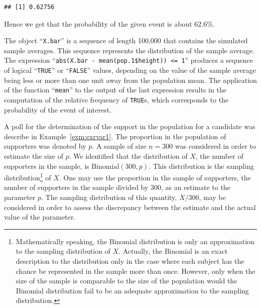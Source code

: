 \documentclass[]{krantz}
\makeatletter
\newenvironment{Shaded}{\begin{snugshade}}{\end{snugshade}}
\newcommand{\KeywordTok}[1]{\textcolor[rgb]{0.13,0.29,0.53}{\textbf{#1}}}
\newcommand{\DecValTok}[1]{\textcolor[rgb]{0.00,0.00,0.81}{#1}}
\newcommand{\StringTok}[1]{\textcolor[rgb]{0.31,0.60,0.02}{#1}}
\newcommand{\OperatorTok}[1]{\textcolor[rgb]{0.81,0.36,0.00}{\textbf{#1}}}
\newcommand{\NormalTok}[1]{#1}
\newenvironment{kframe}{%
\medskip{}
\setlength{\fboxsep}{.8em}
 \def\at@end@of@kframe{}%
 \ifinner\ifhmode%
  \def\at@end@of@kframe{\end{minipage}}%
  \begin{minipage}{\columnwidth}%
 \fi\fi%
 \def\FrameCommand##1{\hskip\@totalleftmargin \hskip-\fboxsep
 \colorbox{shadecolor}{##1}\hskip-\fboxsep
     \hskip-\linewidth \hskip-\@totalleftmargin \hskip\columnwidth}%
 \MakeFramed {\advance\hsize-\width
   \@totalleftmargin\z@ \linewidth\hsize
   \@setminipage}}%
 {\par\unskip\endMakeFramed%
 \at@end@of@kframe}
\renewenvironment{Shaded}{\begin{kframe}}{\end{kframe}}
\theoremstyle{definition}
\theoremstyle{definition}
\theoremstyle{definition}
\theoremstyle{remark}
\let\BeginKnitrBlock\begin \let\EndKnitrBlock\end
\makeatother
\begin{document}
\begin{Shaded}
\end{Shaded}

\begin{verbatim}
## [1] 0.62756
\end{verbatim}

Hence we get that the probability of the given event is about 62.6\%.

The object ``\texttt{X.bar}'' is a sequence of length 100,000 that
contains the simulated sample averages. This sequence represents the
distribution of the sample average. The expression
``\texttt{abs(X.bar\ -\ mean(pop.1\$height))\ \textless{}=\ 1}''
produces a sequence of logical ``\texttt{TRUE}'' or ``\texttt{FALSE}''
values, depending on the value of the sample average being less or more
than one unit away from the population mean. The application of the
function ``\texttt{mean}'' to the output of the last expression results
in the computation of the relative frequency of \texttt{TRUE}s, which
corresponds to the probability of the event of interest.

\BeginKnitrBlock{example}
\protect\hypertarget{exm:exsampdist1}{}{\label{exm:exsampdist1} }A poll for
the determination of the support in the population for a candidate was
describe in Example~\ref{exm:exrvar1}. The proportion in the population
of supporters was denoted by \(p\). A sample of size \(n=300\) was
considered in order to estimate the size of \(p\). We identified that
the distribution of \(X\), the number of supporters in the sample, is
\(\mathrm{Binomial}(300,p)\). This distribution is the sampling
distribution\footnote{Mathematically speaking, the Binomial distribution
  is only an approximation to the sampling distribution of \(X\).
  Actually, the Binomial is an exact description to the distribution
  only in the case where each subject has the chance be represented in
  the sample more than once. However, only when the size of the sample
  is comparable to the size of the population would the Binomial
  distribution fail to be an adequate approximation to the sampling
  distribution.} of \(X\). One may use the proportion in the sample of
supporters, the number of supporters in the sample divided by 300, as an
estimate to the parameter \(p\). The sampling distribution of this
quantity, \(X/300\), may be considered in order to assess the
discrepancy between the estimate and the actual value of the parameter.
\EndKnitrBlock{example}
\end{document}
